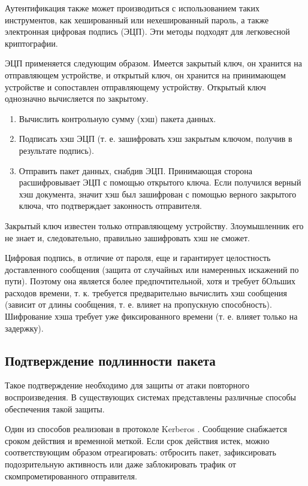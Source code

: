 Аутентификация также может производиться с использованием таких инструментов, как хешированный или нехешированный пароль, а также электронная цифровая подпись (ЭЦП). Эти методы подходят для легковесной криптографии.

ЭЦП применяется следующим образом. Имеется закрытый ключ, он хранится на отправляющем устройстве, и открытый ключ, он хранится на принимающем устройстве и сопоставлен отправляющему устройству. Открытый ключ однозначно вычисляется по закрытому.
\begin{enumerate}
	\item Вычислить контрольную сумму (хэш) пакета данных.
	\item Подписать хэш ЭЦП (т. е. зашифровать хэш закрытым ключом, получив в результате подпись).
	\item Отправить пакет данных, снабдив ЭЦП. Принимающая сторона расшифровывает ЭЦП с помощью открытого ключа. Если получился верный хэш документа, значит хэш был зашифрован с помощью верного закрытого ключа, что подтверждает законность отправителя.
\end{enumerate} 

Закрытый ключ известен только отправляющему устройству. Злоумышленник его не знает и, следовательно, правильно зашифровать хэш не сможет.

Цифровая подпись, в отличие от пароля, еще и гарантирует целостность доставленного сообщения (защита от случайных или намеренных искажений по пути). Поэтому она является более предпочтительной, хотя и требует бОльших расходов времени, т. к. требуется предварительно вычислить хэш сообщения (зависит от длины сообщения, т. е. влияет на пропускную способность). Шифрование хэша требует уже фиксированного времени (т. е. влияет только на задержку).

\subsection{Подтверждение подлинности пакета}

Такое подтверждение необходимо для защиты от атаки повторного воспроизведения. В существующих системах представлены различные способы обеспечения такой защиты.

Один из способов реализован в протоколе Kerberos \cite{src28}.  Сообщение снабжается сроком действия и временной меткой. Если срок действия истек, можно соответствующим образом отреагировать: отбросить пакет, зафиксировать подозрительную активность или даже заблокировать трафик от скомпрометированного отправителя.

